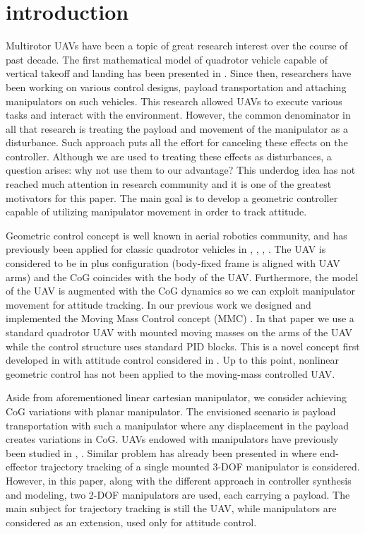 \section{introduction}

Multirotor UAVs have been a topic of great research interest over the course of past decade. The first mathematical model of quadrotor vehicle capable of vertical takeoff and landing has been presented in \cite{hamel2002quad}. Since then, researchers have been working on various control designs, payload transportation and attaching manipulators on such vehicles. This research allowed UAVs to execute various tasks and interact with the environment. However, the common denominator in all that research is treating the payload and movement of the manipulator as a disturbance. Such approach puts all the effort for canceling these effects on the controller. Although we are used to treating these effects as disturbances, a question arises: why not use them to our advantage? This underdog idea has not reached much attention in research community and it is one of the greatest motivators for this paper. The main goal is to develop a geometric controller capable of utilizing manipulator movement in order to track attitude. 

Geometric control concept is well known in aerial robotics community, and has previously been applied for classic quadrotor vehicles in \cite{LeeClanak4}, \cite{LeeClanak3}, \cite{LeeClanak1}, \cite{Kumar}. The UAV is considered to be in plus configuration (body-fixed frame is aligned with UAV arms) and the CoG coincides with the body of the UAV. Furthermore, the model of the UAV is augmented with the CoG dynamics so we can exploit manipulator movement for attitude tracking. In our previous work we designed and implemented the Moving Mass Control concept (MMC) \cite{movingMass1}. In that paper we use a standard quadrotor UAV with mounted moving masses on the arms of the UAV while the control structure uses standard PID blocks. This is a novel concept first developed in \cite{movingMass2} with attitude control considered in \cite{movingMass3}. Up to this point, nonlinear geometric control has not been applied to the moving-mass controlled UAV.

Aside from aforementioned linear cartesian manipulator, we consider achieving CoG variations with planar manipulator. The envisioned scenario is payload transportation with such a manipulator where any displacement in the payload creates variations in CoG. UAVs endowed with manipulators have previously been studied in \cite{manipulator1}, \cite{manipulator2}. Similar problem has already been presented in \cite{manipulator3} where end-effector trajectory tracking of a single mounted 3-DOF manipulator is considered. However, in this paper, along with the different approach in controller synthesis and modeling, two 2-DOF manipulators are used, each carrying a payload. The main subject for trajectory tracking is still the UAV, while manipulators are considered as an extension, used only for attitude control.

